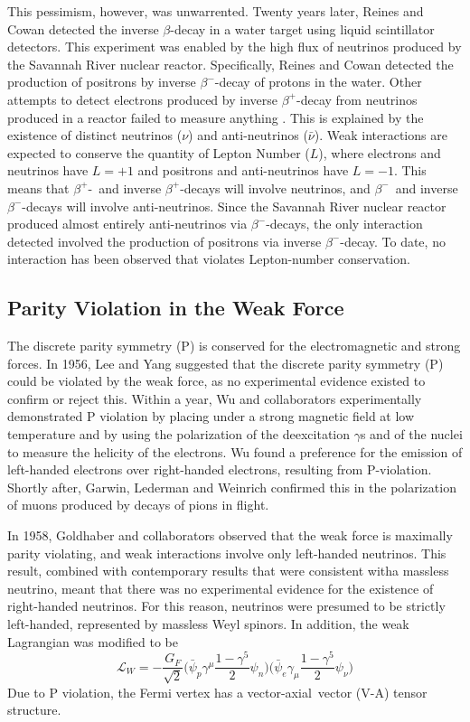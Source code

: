 \documentclass[/main.tex]{subfiles}
\begin{document}
This pessimism, however, was unwarrented.
Twenty years later, Reines and Cowan detected the inverse $\beta$-decay in a water target using liquid scintillator detectors\cite{Cowan1957}.
This experiment was enabled by the high flux of neutrinos produced by the Savannah River nuclear reactor.
Specifically, Reines and Cowan detected the production of positrons by inverse $\beta^-$-decay of protons in the water.
Other attempts to detect electrons produced by inverse $\beta^+$-decay from neutrinos produced in a reactor failed to measure anything \cite{Davis2002}.
This is explained by the existence of distinct neutrinos ($\nu$) and anti-neutrinos ($\bar{\nu}$).
Weak interactions are expected to conserve the quantity of Lepton Number ($L$), where electrons and neutrinos have $L=+1$ and positrons and anti-neutrinos have $L=-1$.
This means that $\beta^+$-~and inverse $\beta^+$-decays will involve neutrinos, and $\beta^-$~and inverse $\beta^-$-decays will involve anti-neutrinos.
Since the Savannah River nuclear reactor produced almost entirely anti-neutrinos via $\beta^-$-decays, the only interaction detected involved the production of positrons via inverse $\beta^-$-decay.
To date, no interaction has been observed that violates Lepton-number conservation.

\subsection{Parity Violation in the Weak Force}
The discrete parity symmetry (P) is conserved for the electromagnetic and strong forces.
In 1956, Lee and Yang suggested that the discrete parity symmetry (P) could be violated by the weak force, as no experimental evidence existed to confirm or reject this\cite{LeeYang1956}.
Within a year, Wu and collaborators experimentally demonstrated P violation by placing  under a strong magnetic field at low temperature and by using the polarization of the deexcitation $\gamma$s and of the nuclei to measure the helicity of the electrons.
Wu found a preference for the emission of left-handed electrons over right-handed electrons, resulting from P-violation\cite{Wu1957}.
Shortly after, Garwin, Lederman and Weinrich confirmed this in the polarization of muons produced by decays of pions in flight\cite{Garwin1957}.

In 1958, Goldhaber and collaborators observed that the weak force is maximally parity violating, and weak interactions involve only left-handed neutrinos\cite{Goldhaber1958}.
This result, combined with contemporary results that were consistent witha massless neutrino\cite{PDG2018}, meant that there was no experimental evidence for the existence of right-handed neutrinos.
For this reason, neutrinos were presumed to be strictly left-handed, represented by massless Weyl spinors.
In addition, the weak Lagrangian was modified to be
\begin{equation}
  \mathcal{L}_W=-\frac{G_F}{\sqrt{2}}\big(\bar \psi_p \gamma^\mu \frac{1-\gamma^5}{2} \psi_n\big)\big(\bar \psi_e \gamma_\mu \frac{1-\gamma^5}{2} \psi_\nu\big)
\end{equation}
Due to P violation, the Fermi vertex has a vector-axial~vector (V-A) tensor structure.
\end{document}
